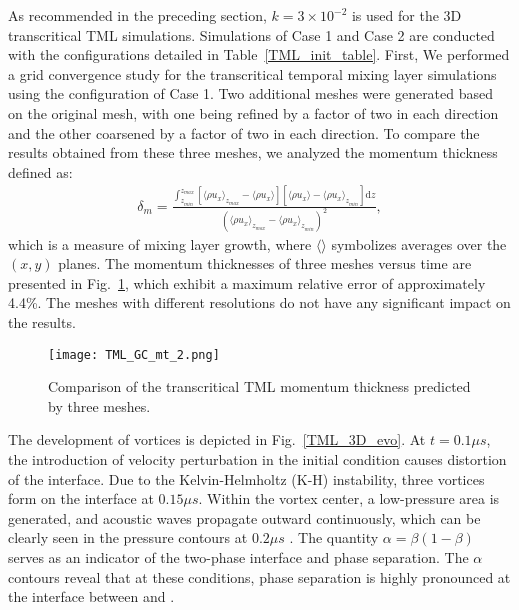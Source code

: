 As recommended in the preceding section, $k = 3\times 10^{-2}$ is used for the 3D transcritical TML simulations.
Simulations of Case 1 and Case 2 are conducted with the configurations detailed in Table~\ref{TML_init_table}. First, We performed a grid convergence study for the transcritical temporal mixing layer simulations using the configuration of Case 1. Two additional meshes were generated based on the original mesh, with one being refined by a factor of two in each direction and the other coarsened by a factor of two in each direction. To compare the results obtained from these three meshes, we analyzed the momentum thickness defined as:
\begin{align}
	\delta_m = \frac{\displaystyle\int_{z_{min}}^{z_{max}}\left[\langle \rho u_x \rangle_{z_{max}} - \langle \rho u_x \rangle\right]\left[\langle \rho u_x \rangle - \langle \rho u_x \rangle_{z_{min}}\right]\mathrm{d}z}{\left(\langle \rho u_x \rangle_{z_{max}} - \langle \rho u_x \rangle_{z_{min}}\right)^2},
\end{align}
which is a measure of mixing layer growth, where $\langle\rangle$ symbolizes averages over the $(x,y)$ planes.
The momentum thicknesses of three meshes versus time are presented in Fig.~\ref{TML_GC}, which exhibit a maximum relative error of approximately 4.4\%. The meshes with different resolutions do not have any significant impact on the results.

\begin{figure}[htbp]
	\centering
	\texttt{[image: TML\_GC\_mt\_2.png]}
	\caption{Comparison of the transcritical TML momentum thickness predicted by three meshes.}
	\label{TML_GC}
\end{figure}

The development of vortices is depicted in Fig.~\ref{TML_3D_evo}. At $t = 0.1 \mu s$, the introduction of velocity perturbation in the initial condition causes distortion of the interface. Due to the Kelvin-Helmholtz (K-H) instability, three vortices form on the interface at $0.15 \mu s$. Within the vortex center, a low-pressure area is generated, and acoustic waves propagate outward continuously, which can be clearly seen in the pressure contours at $0.2 \mu s$ . The quantity $\alpha=\beta(1-\beta)$ serves as an indicator of the two-phase interface and phase separation. The $\alpha$ contours reveal that at these conditions, phase separation is highly pronounced at the interface between  and .%


